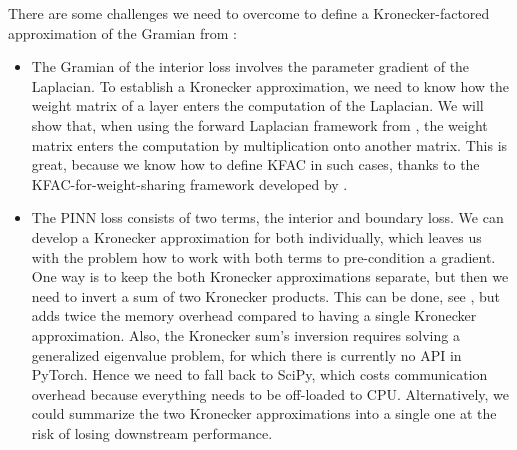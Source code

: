 There are some challenges we need to overcome to define a Kronecker-factored approximation of the Gramian from :
\begin{itemize}
\item The Gramian of the interior loss involves the parameter gradient of the Laplacian. To establish a Kronecker approximation, we need to know how the weight matrix of a layer enters the computation of the Laplacian. We will show that, when using the forward Laplacian framework from \cite{li2023forward}, the weight matrix enters the computation by multiplication onto another matrix. This is great, because we know how to define KFAC in such cases, thanks to the KFAC-for-weight-sharing framework developed by \citet{eschenhagen2023kroneckerfactored}.

\item The PINN loss consists of two terms, the interior and boundary loss.
  We can develop a Kronecker approximation for both individually, which leaves us with the problem how to work with both terms to pre-condition a gradient.
  One way is to keep the both Kronecker approximations separate, but then we need to invert a sum of two Kronecker products.
  This can be done, see , but adds twice the memory overhead compared to having a single Kronecker approximation.
  Also, the Kronecker sum's inversion requires solving a generalized eigenvalue problem, for which there is currently no API in PyTorch.
  Hence we need to fall back to SciPy, which costs communication overhead because everything needs to be off-loaded to CPU.
  Alternatively, we could summarize the two Kronecker approximations into a single one at the risk of losing downstream performance.
\end{itemize}

